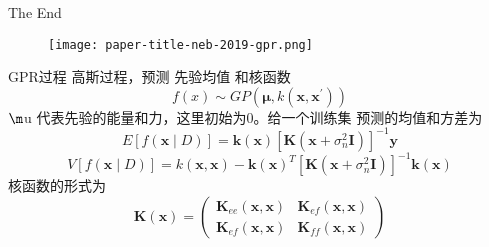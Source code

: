 \documentclass[xcolor=x11names,UTF8]{ctexbeamer}
\begin{document}
\begin{frame}
\Huge{\centerline{The End}}
\end{frame}

\begin{frame}
  \begin{figure}
      \centering
      \texttt{[image: paper-title-neb-2019-gpr.png]}
  \end{figure}

\end{frame}


\begin{frame}{GPR过程}
    高斯过程，预测
    先验均值 和核函数
    \begin{equation}
f(x) \sim G P\left(\boldsymbol{\mu}, k\left(\boldsymbol{x}, \boldsymbol{x}^{\prime}\right)\right)
\end{equation}
$\m$u 代表先验的能量和力，这里初始为0。给一个训练集
预测的均值和方差为
\begin{equation}
E[f(\boldsymbol{x} \mid D)]=\boldsymbol{k}(\boldsymbol{x})\left[\boldsymbol{K}\left(\boldsymbol{x}+\sigma_{n}^{2} \boldsymbol{I}\right)\right]^{-1} \boldsymbol{y}
\end{equation}
\begin{equation}
V[f(\boldsymbol{x} \mid D)]=k(\boldsymbol{x}, \boldsymbol{x})-\boldsymbol{k}(\boldsymbol{x})^{T}\left[\boldsymbol{K}\left(\boldsymbol{x}+\sigma_{n}^{2} \boldsymbol{I}\right)\right]^{-1} \boldsymbol{k}(\boldsymbol{x})
\end{equation}
核函数的形式为
\begin{equation}
\boldsymbol{K}(\boldsymbol{x})=\left(\begin{array}{ll}
\boldsymbol{K}_{e e}(\boldsymbol{x}, \boldsymbol{x}) & \boldsymbol{K}_{e f}(\boldsymbol{x}, \boldsymbol{x}) \\
\boldsymbol{K}_{e f}(\boldsymbol{x}, \boldsymbol{x}) & \boldsymbol{K}_{f f}(\boldsymbol{x}, \boldsymbol{x})
\end{array}\right)
\end{equation}
\end{frame}
\end{document}
